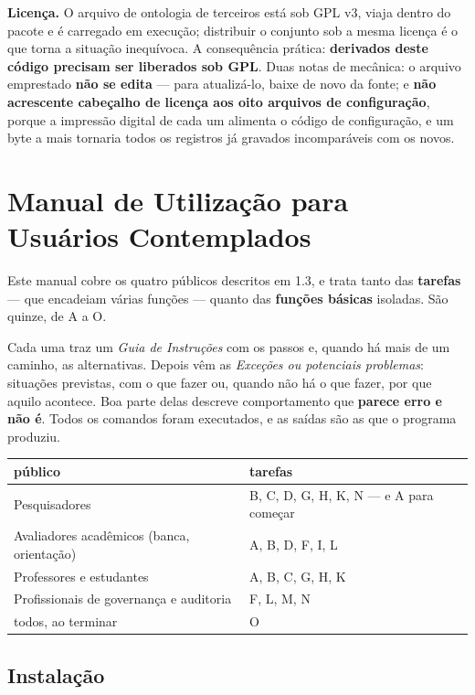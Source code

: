 \documentclass[10pt]{article}
\begin{document}
\textbf{Licença.} O arquivo de ontologia de terceiros está sob GPL v3, viaja dentro do pacote e é carregado em execução; distribuir o conjunto sob a mesma licença é o que torna a situação inequívoca. A consequência prática: \textbf{derivados deste código precisam ser liberados sob GPL}. Duas notas de mecânica: o arquivo emprestado \textbf{não se edita} --- para atualizá-lo, baixe de novo da fonte; e \textbf{não acrescente cabeçalho de licença aos oito arquivos de configuração}, porque a impressão digital de cada um alimenta o código de configuração, e um byte a mais tornaria todos os registros já gravados incomparáveis com os novos.

\section{Manual de Utilização para Usuários Contemplados}

Este manual cobre os quatro públicos descritos em 1.3, e trata tanto das \textbf{tarefas} --- que encadeiam várias funções --- quanto das \textbf{funções básicas} isoladas. São quinze, de A a O.

Cada uma traz um \emph{Guia de Instruções} com os passos e, quando há mais de um caminho, as alternativas. Depois vêm as \emph{Exceções ou potenciais problemas}: situações previstas, com o que fazer ou, quando não há o que fazer, por que aquilo acontece. Boa parte delas descreve comportamento que \textbf{parece erro e não é}. Todos os comandos foram executados, e as saídas são as que o programa produziu.

\begin{center}\footnotesize
\begin{tabular}{p{}p{}}
\toprule
\textbf{público} & \textbf{tarefas} \\
\midrule
Pesquisadores & B, C, D, G, H, K, N --- e A para começar \\
Avaliadores acadêmicos (banca, orientação) & A, B, D, F, I, L \\
Professores e estudantes & A, B, C, G, H, K \\
Profissionais de governança e auditoria & F, L, M, N \\
todos, ao terminar & O \\
\bottomrule
\end{tabular}
\end{center}

\subsection{Instalação}
\end{document}
